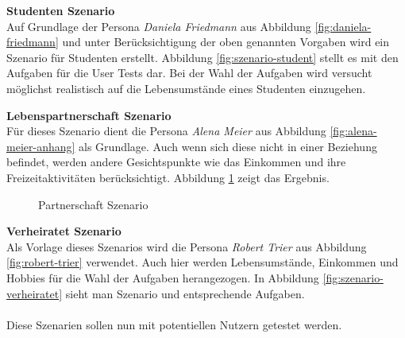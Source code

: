 \textbf{Studenten Szenario}\\
Auf Grundlage der Persona \textit{Daniela Friedmann} aus Abbildung \ref{fig:daniela-friedmann} und unter Berücksichtigung der oben genannten Vorgaben wird ein Szenario für Studenten erstellt. Abbildung \ref{fig:szenario-student} stellt es mit den Aufgaben für die User Tests dar. Bei der Wahl der Aufgaben wird versucht möglichst realistisch auf die Lebensumstände eines Studenten einzugehen. 

\textbf{Lebenspartnerschaft Szenario}\\
Für dieses Szenario dient die Persona \textit{Alena Meier} aus Abbildung \ref{fig:alena-meier-anhang} als Grundlage. Auch wenn sich diese nicht in einer Beziehung befindet, werden andere Gesichtspunkte wie das Einkommen und ihre Freizeitaktivitäten berücksichtigt. Abbildung \ref{fig:szenario-partner} zeigt das Ergebnis. 

\begin{figure}[!htb]
    \centering
    \caption{Partnerschaft Szenario}
    \label{fig:szenario-partner}
\end{figure}

\textbf{Verheiratet Szenario}\\
Als Vorlage dieses Szenarios wird die Persona \textit{Robert Trier} aus Abbildung \ref{fig:robert-trier} verwendet. Auch hier werden Lebensumstände, Einkommen und Hobbies für die Wahl der Aufgaben herangezogen. In Abbildung \ref{fig:szenario-verheiratet} sieht man Szenario und entsprechende Aufgaben.\\\\
Diese Szenarien sollen nun mit potentiellen Nutzern getestet werden. 

